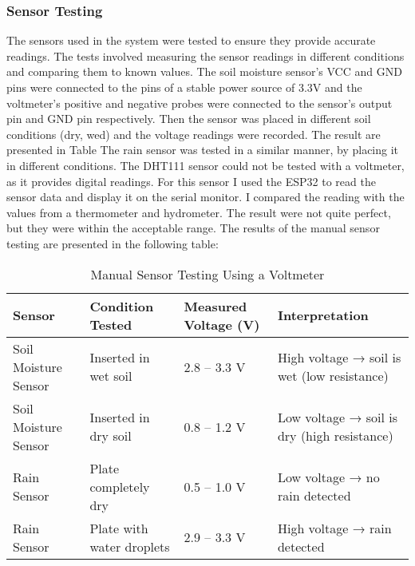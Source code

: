 \subsubsection{Sensor Testing}
The sensors used in the system were tested to ensure they provide accurate readings.
The tests involved measuring the sensor readings in different conditions and comparing them to known values. The soil moisture sensor's VCC 
and GND pins were connected to the pins of a stable power source of 3.3V and the voltmeter's positive and negative probes were connected
to the sensor's output pin and GND pin respectively. Then the sensor was placed in different soil conditions (dry, wed)
and the voltage readings were recorded. The result are presented in Table
The rain sensor was tested in a similar manner, by placing it in different conditions.
The DHT111 sensor could not be tested with a voltmeter, as it provides digital readings. For this sensor I used 
the ESP32 to read the sensor data and display it on the serial monitor. I compared the reading with the values from a thermometer and hydrometer. The
result were not quite perfect, but they were within the acceptable range.
The results of the manual sensor testing are presented in the following table:
\begin{table}[H]
\centering
\begin{tabular}{|p{4.2cm}|p{5cm}|p{3.5cm}|p{3.5cm}|}
\hline
\textbf{Sensor} & \textbf{Condition Tested} & \textbf{Measured Voltage (V)} & \textbf{Interpretation} \\
\hline
Soil Moisture Sensor & Inserted in wet soil & 2.8 – 3.3 V & High voltage → soil is wet (low resistance) \\
\hline
Soil Moisture Sensor & Inserted in dry soil & 0.8 – 1.2 V & Low voltage → soil is dry (high resistance) \\
\hline
Rain Sensor & Plate completely dry & 0.5 – 1.0 V & Low voltage → no rain detected \\
\hline
Rain Sensor & Plate with water droplets & 2.9 – 3.3 V & High voltage → rain detected \\
\hline
\end{tabular}
\caption{Manual Sensor Testing Using a Voltmeter}
\label{tab:voltmeter_sensor_test}
\end{table}